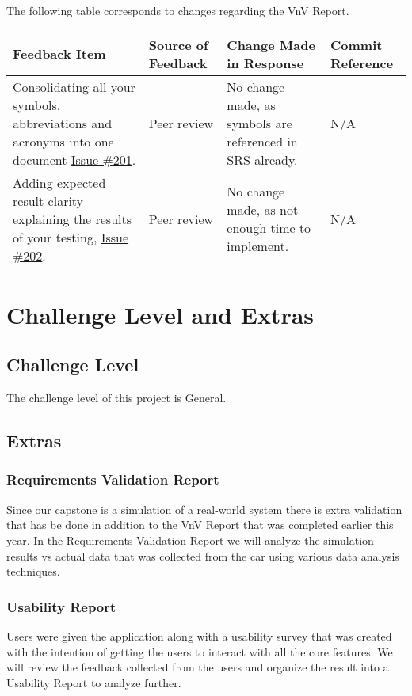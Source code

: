 \documentclass{article}
\begin{document}
The following table corresponds to changes regarding the VnV Report.
\begin{longtable}{|p{4cm}|p{1.5cm}|p{4cm}|p{1.5cm}|}
    \hline
    \textbf{Feedback Item} & \textbf{Source of Feedback} & \textbf{Change Made in Response} & \textbf{Commit Reference} \\
    \hline
    \endfirsthead
    \hline
    \endhead
    \hline
    \endfoot
    \hline
    \endlastfoot
    Consolidating all your symbols, abbreviations and acronyms into one document \href{https://github.com/gr812b/CVT-Simulator/issues/201}{Issue \#201}. & Peer review  & No change made, as symbols are referenced in SRS already. & N/A \\
    \hline
    Adding expected result clarity explaining the results of your testing, \href{https://github.com/gr812b/CVT-Simulator/issues/202}{Issue \#202}. & Peer review  & No change made, as not enough time to implement. & N/A \\
    
    \hline 
\end{longtable}    
\section{Challenge Level and Extras}

\subsection{Challenge Level}

\noindent The challenge level of this project is General. 

\subsection{Extras}

\subsubsection{Requirements Validation Report}
\noindent Since our capstone is a simulation of a real-world system there is extra validation that has be done in addition to the VnV Report that was completed earlier this year. 
In the Requirements Validation Report we will analyze the simulation results vs actual data that was collected from the car using various data analysis techniques.

\subsubsection{Usability Report}
\noindent Users were given the application along with a usability survey that was created with the intention of getting the users to interact with all the core features. We will review the feedback collected from the users
 and organize the result into a Usability Report to analyze further.
\end{document}
